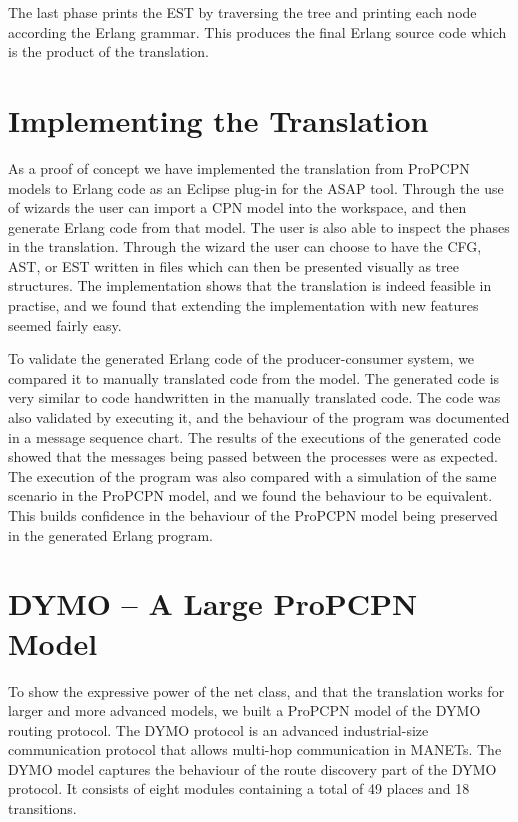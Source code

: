 The last phase prints the EST by traversing the tree and printing each node according the Erlang grammar. This produces the final Erlang source code which is the product of the translation. 

\section{Implementing the Translation}

As a proof of concept we have implemented the translation from ProPCPN models to Erlang code as an Eclipse plug-in for the ASAP tool. Through the use of wizards the user can import a CPN model into the workspace, and then generate Erlang code from that model. The user is also able to inspect the phases in the translation. Through the wizard the user can choose to have the CFG, AST, or EST written in files which can then be presented visually as tree structures. The implementation shows that the translation is indeed feasible in practise, and we found that extending the implementation with new features seemed fairly easy.  

To validate the generated Erlang code of the producer-consumer system, we compared it to manually translated code from the model. The generated code is very similar to code handwritten in the manually translated code. The code was also validated by executing it, and the behaviour of the program was documented in a message sequence chart. The results of the executions of the generated code showed that the messages being passed between the processes were as expected. The execution of the program was also compared with a simulation of the same scenario in the ProPCPN model, and we found the behaviour to be equivalent. This builds confidence in the behaviour of the ProPCPN model being preserved in the generated Erlang program.

\section{DYMO -- A Large ProPCPN Model}
To show the expressive power of the net class, and that the translation works for larger and more advanced models, we built a ProPCPN model of the DYMO routing protocol. The DYMO protocol is an advanced industrial-size communication protocol that allows multi-hop communication in MANETs. The DYMO model captures the behaviour of the route discovery part of the DYMO protocol. It consists of eight modules containing a total of 49 places and 18 transitions.

